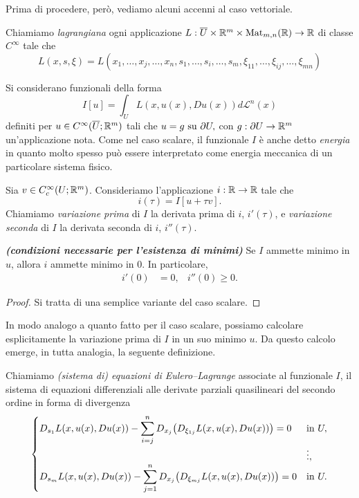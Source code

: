 Prima di procedere, però, vediamo alcuni accenni al caso vettoriale.
\begin{definizione}
	Chiamiamo \emph{lagrangiana} ogni applicazione $L: \overline{U} \times \mathbb{R}^m \times \textup{Mat}_{m,n}(\mathbb{R}) \to \mathbb{R}$ di classe $C^\infty$ tale che
	\[ L(x,s,\xi) = L(x_1,\dots, x_j,\dots,x_n, s_1,\dots,s_i,\dots,s_m, \xi_{11},\dots,\xi_{ij},\dots,\xi_{mn}) \]
\end{definizione}
Si considerano funzionali della forma
\[ I[u] = \int_U L(x,u(x),Du(x))d\mathcal{L}^n(x) \]
definiti per $u \in C^\infty(\overline{U};\mathbb{R}^m)$ tali che $u= g \textup{ su } \partial U,$ con $g: \partial U \to \mathbb{R}^m$ un'applicazione nota. Come nel caso scalare, il funzionale $I$ è anche detto \emph{energia} in quanto molto spesso può essere interpretato come energia meccanica di un particolare sistema fisico.
\begin{definizione}
	Sia $v \in C^\infty_c(U;\mathbb{R}^m)$. Consideriamo l'applicazione $i: \mathbb{R} \to \mathbb{R}$ tale che
	\[  i(\tau) = I[u+\tau v].\]
	Chiamiamo \emph{variazione prima} di $I$ la derivata prima di $i$, $i'(\tau)$, e \emph{variazione seconda} di $I$ la derivata seconda di $i$, $i''(\tau)$.
\end{definizione}
\begin{proposizione}\emph{\textbf{(condizioni necessarie per l'esistenza di minimi)}}
	Se $I$ ammette minimo in $u$, allora $i$ ammette minimo in $0$. In particolare, 
	\begin{align*}
		i'(0) &= 0, & i''(0)\ge 0.
	\end{align*}
	
	\begin{proof}
		Si tratta di una semplice variante del caso scalare.
	\end{proof}
\end{proposizione}
In modo analogo a quanto fatto per il caso scalare, possiamo calcolare esplicitamente la variazione prima di $I$ in un suo minimo $u$. Da questo calcolo emerge, in tutta analogia, la seguente definizione.
\begin{definizione}
	Chiamiamo \emph{(sistema di) equazioni di Eulero--Lagrange} associate al funzionale $I$, il sistema di equazioni differenziali alle derivate parziali quasilineari del secondo ordine in forma di divergenza
	\[ \begin{cases}
		D_{s_1}L(x,u(x),Du(x))-\displaystyle \sum_{i=j}^{n} D_{x_j}\bigl( D_{\xi_{1j}}L(x,u(x),Du(x))\bigr) = 0 & \textup{in } U,\\
		& \vdots,\\
		D_{s_m}L(x,u(x),Du(x))-\displaystyle\sum_{j=1}^{n} D_{x_j}\bigl( D_{\xi_{mj}}L(x,u(x),Du(x))\bigr) = 0 & \textup{in } U.
	\end{cases}\]
\end{definizione}

